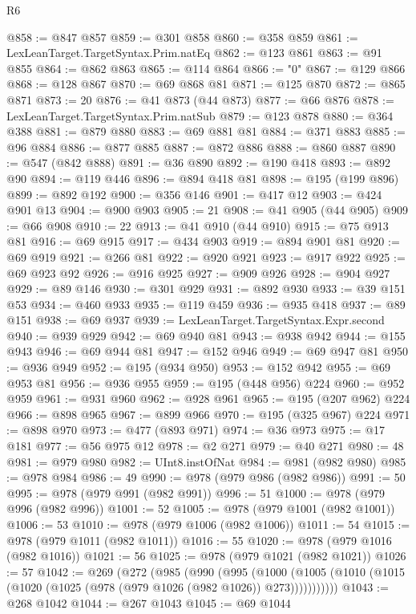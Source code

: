 \begin{lexlean}{R6}
\begin{coremodule}
@858 := @847 @857
@859 := @301 @858
@860 := @358 @859
@861 := LexLeanTarget.TargetSyntax.Prim.natEq
@862 := @123 @861
@863 := @91 @855
@864 := @862 @863
@865 := @114 @864
@866 := "0"
@867 := @129 @866
@868 := @128 @867
@870 := @69 @868 @81
@871 := @125 @870
@872 := @865 @871
@873 := 20
@876 := @41 @873 (@44 @873)
@877 := @66 @876
@878 := LexLeanTarget.TargetSyntax.Prim.natSub
@879 := @123 @878
@880 := @364 @388
@881 := @879 @880
@883 := @69 @881 @81
@884 := @371 @883
@885 := @96 @884
@886 := @877 @885
@887 := @872 @886
@888 := @860 @887
@890 := @547 (@842 @888)
@891 := @36 @890
@892 := @190 @418
@893 := @892 @90
@894 := @119 @446
@896 := @894 @418 @81
@898 := @195 (@199 @896)
@899 := @892 @192
@900 := @356 @146
@901 := @417 @12
@903 := @424 @901 @13
@904 := @900 @903
@905 := 21
@908 := @41 @905 (@44 @905)
@909 := @66 @908
@910 := 22
@913 := @41 @910 (@44 @910)
@915 := @75 @913 @81
@916 := @69 @915
@917 := @434 @903
@919 := @894 @901 @81
@920 := @69 @919
@921 := @266 @81
@922 := @920 @921
@923 := @917 @922
@925 := @69 @923 @92
@926 := @916 @925
@927 := @909 @926
@928 := @904 @927
@929 := @89 @146
@930 := @301 @929
@931 := @892 @930
@933 := @39 @151 @53
@934 := @460 @933
@935 := @119 @459
@936 := @935 @418
@937 := @89 @151
@938 := @69 @937
@939 := LexLeanTarget.TargetSyntax.Expr.second
@940 := @939 @929
@942 := @69 @940 @81
@943 := @938 @942
@944 := @155 @943
@946 := @69 @944 @81
@947 := @152 @946
@949 := @69 @947 @81
@950 := @936 @949
@952 := @195 (@934 @950)
@953 := @152 @942
@955 := @69 @953 @81
@956 := @936 @955
@959 := @195 (@448 @956) @224
@960 := @952 @959
@961 := @931 @960
@962 := @928 @961
@965 := @195 (@207 @962) @224
@966 := @898 @965
@967 := @899 @966
@970 := @195 (@325 @967) @224
@971 := @898 @970
@973 := @477 (@893 @971)
@974 := @36 @973
@975 := @17 @181
@977 := @56 @975 @12
@978 := @2 @271
@979 := @40 @271
@980 := 48
@981 := @979 @980
@982 := UInt8.instOfNat
@984 := @981 (@982 @980)
@985 := @978 @984
@986 := 49
@990 := @978 (@979 @986 (@982 @986))
@991 := 50
@995 := @978 (@979 @991 (@982 @991))
@996 := 51
@1000 := @978 (@979 @996 (@982 @996))
@1001 := 52
@1005 := @978 (@979 @1001 (@982 @1001))
@1006 := 53
@1010 := @978 (@979 @1006 (@982 @1006))
@1011 := 54
@1015 := @978 (@979 @1011 (@982 @1011))
@1016 := 55
@1020 := @978 (@979 @1016 (@982 @1016))
@1021 := 56
@1025 := @978 (@979 @1021 (@982 @1021))
@1026 := 57
@1042 := @269
    (@272
      (@985
        (@990
          (@995
            (@1000
              (@1005 (@1010 (@1015 (@1020 (@1025 (@978 (@979 @1026 (@982 @1026)) @273)))))))))))
@1043 := @268 @1042
@1044 := @267 @1043
@1045 := @69 @1044

\end{coremodule}
\end{lexlean}
